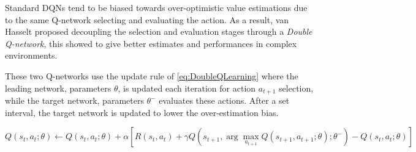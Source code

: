 Standard DQNs tend to be biased towards over-optimistic value estimations due to the same Q-network selecting and evaluating the action. As a result, van Hasselt \cite{vanhasselt2016deep} proposed decoupling the selection and evaluation stages through a \textit{Double Q-network}, this showed to give better estimates and performances in complex environments.

These two Q-networks use the update rule of \autoref{eq:DoubleQLearning} where the leading network, parameters \(\theta\), is updated each iteration for action \(a_{t+1}\) selection, while the target network, parameters \(\theta^{-}\) evaluates these actions. After a set interval, the target network is updated to lower the over-estimation bias.

\begin{equation}
    Q(s_t, a_t; \theta) \leftarrow Q(s_t, a_t; \theta) + \alpha \left[ R(s_t, a_t) + \gamma Q(s_{t+1}, \arg\max_{a_{t+1}} Q(s_{t+1}, a_{t+1}; \theta); \theta^{-}) - Q(s_t, a_t; \theta) \right]
\label{eq:DoubleQLearning}
\end{equation}